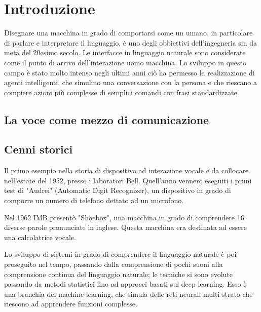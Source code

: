 \documentclass[twoside]{supsistudent}
\begin{document}
\maketitle
\onehalfspacing
\frontmatter



\newpage
\mainmatter
{}
\setcounter{page}{1}

\chapter{Introduzione}

Disegnare una macchina in grado di comportarsi come un umano, in particolare di parlare e interpretare il linguaggio\color{red}, \color{black}  è uno degli obbiettivi dell'ingegneria sin da metà del 20esimo secolo. Le interfacce in linguaggio naturale  sono considerate come il punto di arrivo dell'interazione uomo macchina.
Lo sviluppo in questo campo è stato molto intenso negli ultimi anni ciò ha permesso la realizzazione di agenti intelligenti, che simulino una conversazione con la persona e che riescano a compiere azioni più complesse di semplici comandi con frasi standardizzate.

\section{La voce come mezzo di comunicazione}

\section{Cenni storici}

Il primo esempio nella storia di dispositivo ad interazione vocale è da collocare nell'estate del 1952, presso i laboratori Bell.
Quell'anno vennero eseguiti i primi test di "Audrei" (Automatic Digit Recognizer), un dispositivo in grado di comporre un numero di telefono dettato ad un microfono.

Nel 1962 IMB presentò "Shoebox", una macchina in grado di comprendere 16 diverse parole pronunciate in inglese. Questa macchina era destinata ad essere una calcolatrice vocale.

Lo sviluppo di sistemi in grado di comprendere il linguaggio naturale è poi proseguito nel tempo, passando dalla comprensione di pochi suoni alla comprensione continua del linguaggio naturale; le tecniche si sono evolute passando da metodi statistici fino ad approcci basati sul deep learning. Esso è una branchia del machine learning, che simula delle reti neurali multi strato che riescono ad apprendere funzioni complesse. \cite{deeplearninggeneral}
\end{document}
